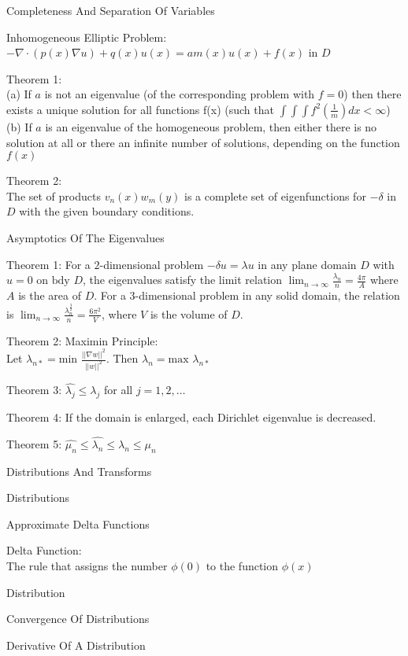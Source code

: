 Completeness And Separation Of Variables

Inhomogeneous Elliptic Problem: \\
$- \nabla \cdot (p(x) \nabla u)+q(x)u(x) = a m(x)u(x)+f(x)$ in $D$

Theorem 1: \\
(a) If $a$ is not an eigenvalue (of the corresponding problem with $f=0$) then there exists a unique solution for all functions f(x) (such that $\int \int \int f^2(\frac{1}{m})dx < \infty$) \\
(b) If $a$ is an eigenvalue of the homogeneous problem, then either there is no solution at all or there an infinite number of solutions, depending on the function $f(x)$

Theorem 2: \\
The set of products $v_n (x) w_m (y)$ is a complete set of eigenfunctions for $- \delta$ in $D$ with the given boundary conditions.

Asymptotics Of The Eigenvalues

Theorem 1: For a $2$-dimensional problem $- \delta u = \lambda u$ in any plane domain $D$ with $u=0$ on $\text{bdy }D$, the eigenvalues satisfy the limit relation $\lim_{n \to \infty} \frac{\lambda_n}{n} = \frac{4 \pi}{A}$ where $A$ is the area of $D$. For a $3$-dimensional problem in any solid domain, the relation is $\lim_{n \to \infty} \frac{\lambda_n^{\frac{3}{2}}}{n} = \frac{6 \pi^2}{V}$, where $V$ is the volume of $D$.

Theorem 2: Maximin Principle: \\
Let $\lambda_{n*} = \text{min }\frac{||\nabla w||^2}{||w||^2}$. Then $\lambda_n=\text{max }\lambda_{n*}$

Theorem 3: $\hat{\lambda_j} \le \lambda_j$ for all $j=1,2,\dots$

Theorem 4: If the domain is enlarged, each Dirichlet eigenvalue is decreased.

Theorem 5: $\hat{\mu_n} \le \hat{\lambda_n} \le \lambda_n \le \mu_n$

Distributions And Transforms

Distributions

Approximate Delta Functions

Delta Function: \\
The rule that assigns the number $\phi (0)$ to the function $\phi (x)$

Distribution

Convergence Of Distributions

Derivative Of A Distribution

